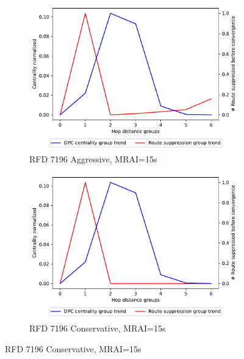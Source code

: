\begin{figure}[H]
\begin{subfigure}[b]{0.325\textwidth}
     \end{subfigure}
     \hfill
     \begin{subfigure}[b]{0.325\textwidth}
         \centering
         \includegraphics[width=\textwidth]{images/RFD/miceVSelephants/MultiMRAI/15/elephants/cisco_1000_RFD_7196_aggressive_nodeConvergence_centVSsup_trend.pdf}
         \caption{\scriptsize RFD 7196 Aggressive, MRAI=15s}
         \label{fig:1000_7196RFDA_centVSsup_elephants_MRAI15}
     \end{subfigure}
     \hfill
     \begin{subfigure}[b]{0.325\textwidth}
         \centering
         \includegraphics[width=\textwidth]{images/RFD/miceVSelephants/MultiMRAI/15/elephants/cisco_1000_RFD_7196_conservative_nodeConvergence_centVSsup_trend.pdf}
         \caption{\scriptsize RFD 7196 Conservative, MRAI=15s}
         \label{fig:1000_7196RFDC_centVSsup_elephants_MRAI15}

\end{subfigure}
\end{figure}

